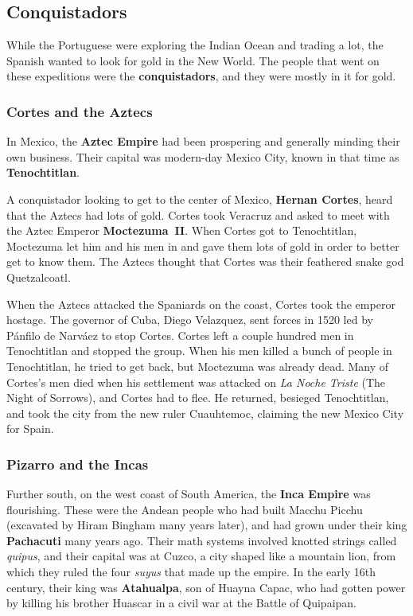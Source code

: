 \subsection*{Conquistadors}

While the Portuguese were exploring the Indian Ocean and trading a lot,
the Spanish wanted to look for gold in the New World.
The people that went on these expeditions were the \textbf{conquistadors},
and they were mostly in it for gold.

\subsubsection*{Cortes and the Aztecs}

In Mexico, the \textbf{Aztec Empire} had been prospering and generally minding their own business.
Their capital was modern-day Mexico City, known in that time as \textbf{Tenochtitlan}.

A conquistador looking to get to the center of Mexico,
\textbf{Hernan Cortes}, heard that the Aztecs had lots of gold.
Cortes took Veracruz and asked to meet with the Aztec Emperor \textbf{Moctezuma~II}.
When Cortes got to Tenochtitlan,
Moctezuma let him and his men in and gave them lots of gold in order to better get to know them.
The Aztecs thought that Cortes was their feathered snake god Quetzalcoatl.

When the Aztecs attacked the Spaniards on the coast, Cortes took the emperor hostage.
The governor of Cuba, Diego Velazquez,
sent forces in 1520 led by P\'anfilo de Narv\'aez to stop Cortes.
Cortes left a couple hundred men in Tenochtitlan and stopped the group.
When his men killed a bunch of people in Tenochtitlan,
he tried to get back, but Moctezuma was already dead.
Many of Cortes's men died
when his settlement was attacked on \textit{La Noche Triste} (The Night of Sorrows),
and Cortes had to flee.
He returned, besieged Tenochtitlan, and took the city from the new ruler Cuauhtemoc,
claiming the new Mexico City for Spain.

\subsubsection*{Pizarro and the Incas}

Further south, on the west coast of South America, the \textbf{Inca Empire} was flourishing.
These were the Andean people who had built Macchu Picchu
(excavated by Hiram Bingham many years later),
and had grown under their king \textbf{Pachacuti} many years ago.
Their math systems involved knotted strings called \textit{quipus},
and their capital was at Cuzco, a city shaped like a mountain lion,
from which they ruled the four \textit{suyus} that made up the empire.
In the early 16th century, their king was \textbf{Atahualpa}, son of Huayna Capac,
who had gotten power by killing his brother Huascar in a civil war at the Battle of Quipaipan.


